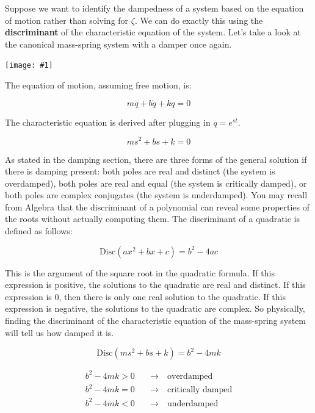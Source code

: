 \documentclass{article}
\newcommand{\bicture}[1]{
\begin{center}
    {\texttt{[image: \#1]}}
\end{center}}
\begin{document}
\begin{onehalfspacing}
\begin{flushleft}
Suppose we want to identify the dampedness of a system based on the equation of motion rather than solving for \(\zeta\). We can do exactly this using the \textbf{discriminant} of the characteristic equation of the system. Let's take a look at the canonical mass-spring system with a damper once again.

\bicture{2_unf}

The equation of motion, assuming free motion, is:

\vspace{-0.1in}
\[m\ddot{q} + b \dot{q} + k q = 0\]

The characteristic equation is derived after plugging in \(q = e^{st}\).

\vspace{-0.1in}
\[ms^2 + bs + k = 0\]

As stated in the damping section, there are three forms of the general solution if there is damping present: both poles are real and distinct (the system is overdamped), both poles are real and equal (the system is critically damped), or both poles are complex conjugates (the system is underdamped). You may recall from Algebra that the discriminant of a polynomial can reveal some properties of the roots without actually computing them. The discriminant of a quadratic is defined as follows:

\vspace{-0.1in}
\[\text{Disc}(ax^2 + bx + c) = b^2-4ac\]

This is the argument of the square root in the quadratic formula. If this expression is positive, the solutions to the quadratic are real and distinct. If this expression is 0, then there is only one real solution to the quadratic. If this expression is negative, the solutions to the quadratic are complex. So physically, finding the discriminant of the characteristic equation of the mass-spring system will tell us how damped it is.

\vspace{-0.1in}
\[\text{Disc}(ms^2 + bs + k) = b^2-4mk\]

\vspace{-0.35in}

\begin{align*}
    b^2 - 4mk > 0 \quad &\to \quad \text{overdamped} \\
    b^2 - 4mk = 0 \quad &\to \quad \text{critically damped} \\
    b^2 - 4mk < 0 \quad &\to \quad \text{underdamped} \\
\end{align*}


\end{flushleft}
\end{onehalfspacing}
\end{document}
